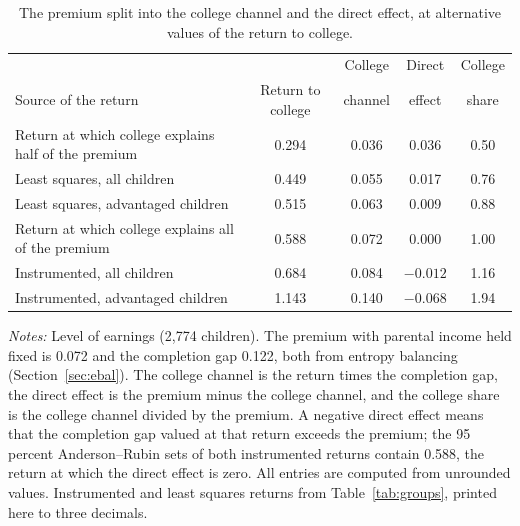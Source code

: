 \documentclass[11pt]{article}
\begin{document}
\begin{table}[t]
\centering
\small
\caption{The premium split into the college channel and the direct
effect, at alternative values of the return to college.}
\label{tab:bounds}
\setlength{\tabcolsep}{4pt}
\begin{tabular}{@{}lcccc@{}}
\toprule
& & College & Direct & College \\
Source of the return & Return to college & channel & effect & share \\
\midrule
Return at which college explains half of the premium & 0.294 & 0.036 & 0.036 & 0.50 \\
Least squares, all children & 0.449 & 0.055 & 0.017 & 0.76 \\
Least squares, advantaged children & 0.515 & 0.063 & 0.009 & 0.88 \\
Return at which college explains all of the premium & 0.588 & 0.072 & 0.000 & 1.00 \\
Instrumented, all children & 0.684 & 0.084 & $-0.012$ & 1.16 \\
Instrumented, advantaged children & 1.143 & 0.140 & $-0.068$ & 1.94 \\
\bottomrule
\end{tabular}
\par\smallskip
\begin{minipage}{0.9\textwidth}
\footnotesize\emph{Notes:} Level of earnings (2,774 children). The premium with parental income held fixed is 0.072 and the completion gap 0.122, both from entropy balancing
(Section~\ref{sec:ebal}). The college channel is the return times the completion gap, the direct effect is the premium minus the college channel, and the college share is the college channel divided
by the premium. A negative direct effect means that the completion gap valued at that return exceeds the premium; the 95 percent Anderson--Rubin sets of both instrumented returns contain 0.588, the return at which the direct effect is zero. All entries are computed from unrounded values. Instrumented and least squares returns from Table~\ref{tab:groups}, printed here to three decimals.
\end{minipage}
\end{table}
\end{document}
